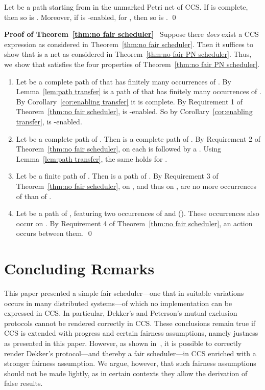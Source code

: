 \documentclass[smallcondensed]{svjour3}
\newcommand{\Thm}[1]{Theorem~\ref{thm:#1}}
\newcommand{\Cor}[1]{Corollary~\ref{cor:#1}}
\newcommand{\Lem}[1]{Lemma~\ref{lem:#1}}
\newcounter {part}
\begin{document}
\begin{corollary}\label{cor:enabling transfer}
Let  be a path starting from  in the unmarked Petri net of CCS.
If  is complete, then so is .
Moreover, if  is -enabled, for , then so is .
\qed
\end{corollary}

\noindent
\textbf{Proof of \Thm{no fair scheduler}}~
Suppose there \emph{does} exist a CCS expression  as considered in \Thm{no fair scheduler}.
Then it suffices to show that  is a net  as considered in \Thm{no fair PN scheduler}.
Thus, we show that  satisfies the four properties of \Thm{no fair PN scheduler}.
\begin{enumerate}
\item Let  be a complete path of  that has finitely many occurrences of .
  By \Lem{path transfer}  is a path of  that has finitely many occurrences of .
  By \Cor{enabling transfer} it is complete. By Requirement 1 of \Thm{no fair scheduler}, 
  is -enabled. So by \Cor{enabling transfer},  is -enabled.
\item Let  be a complete path of . Then  is a complete path of .
  By Requirement 2 of \Thm{no fair scheduler}, on  each  is followed by a .
  Using \Lem{path transfer}, the same holds for .
\item Let  be a finite path of .
  Then  is a path of .
  By Requirement 3 of \Thm{no fair scheduler}, on , and thus on , are no
  more occurrences of  than of .
\item Let  be a path of , featuring two occurrences of  and  ().
  These occurrences also occur on .
  By Requirement 4 of \Thm{no fair scheduler}, an action  occurs between them.
\qed
\end{enumerate}

\section{Concluding Remarks}\label{sec:conclusion} 
\newcommand{\prio}{\mathbin{\rhd}}
This paper presented a simple fair scheduler---one that in suitable variations occurs in many
distributed systems---of which no implementation can be expressed in CCS\@.
In particular, Dekker's and Peterson's mutual exclusion protocols cannot be rendered correctly in CCS.
These conclusions remain true if CCS is extended with progress and certain fairness assumptions, namely justness as presented in this paper.
However, as shown in~\cite{CorradiniEtAl09}, it is possible to correctly render Dekker's
protocol---and thereby a fair scheduler---in CCS enriched with a stronger fairness assumption. 
We argue, however, that such fairness assumptions should not be made lightly, as in certain contexts they
allow the derivation of false results.
\end{document}
